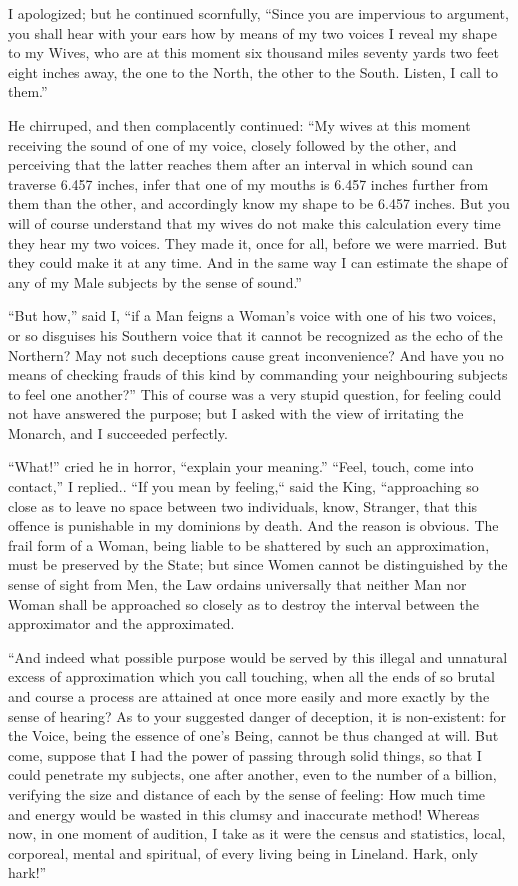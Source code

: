 \documentclass[12pt, a4paper, twoside]{memoir}
\begin{document}
I apologized; but he continued scornfully, ``Since you are impervious to
argument, you shall hear with your ears how by means of my two voices I reveal
my shape to my Wives, who are at this moment six thousand miles seventy yards
two feet eight inches away, the one to the North, the other to the South.
Listen, I call to them.''

He chirruped, and then complacently continued: ``My wives at this moment
receiving the sound of one of my voice, closely followed by the other, and
perceiving that the latter reaches them after an interval in which sound can
traverse 6.457 inches, infer that one of my mouths is 6.457 inches further
from them than the other, and accordingly know my shape to be 6.457 inches.
But you will of course understand that my wives do not make this calculation
every time they hear my two voices. They made it, once for all, before we were
married. But they could make it at any time. And in the same way I can
estimate the shape of any of my Male subjects by the sense of sound.''

``But how,'' said I, ``if a Man feigns a Woman's voice with one of his two
voices, or so disguises his Southern voice that it cannot be recognized as the
echo of the Northern? May not such deceptions cause great inconvenience? And
have you no means of checking frauds of this kind by commanding your
neighbouring subjects to feel one another?'' This of course was a very stupid
question, for feeling could not have answered the purpose; but I asked with
the view of irritating the Monarch, and I succeeded perfectly.

``What!'' cried he in horror, ``explain your meaning.'' ``Feel, touch, come into
contact,'' I replied.. ``If you mean by feeling,`` said the King, ``approaching so
close as to leave no space between two individuals, know, Stranger, that this
offence is punishable in my dominions by death. And the reason is obvious. The
frail form of a Woman, being liable to be shattered by such an approximation,
must be preserved by the State; but since Women cannot be distinguished by the
sense of sight from Men, the Law ordains universally that neither Man nor
Woman shall be approached so closely as to destroy the interval between the
approximator and the approximated.

``And indeed what possible purpose would be served by this illegal and
unnatural excess of approximation which you call touching, when all the ends
of so brutal and course a process are attained at once more easily and more
exactly by the sense of hearing? As to your suggested danger of deception, it
is non-existent: for the Voice, being the essence of one's Being, cannot be
thus changed at will. But come, suppose that I had the power of passing
through solid things, so that I could penetrate my subjects, one after
another, even to the number of a billion, verifying the size and distance of
each by the sense of feeling: How much time and energy would be wasted in this
clumsy and inaccurate method! Whereas now, in one moment of audition, I take
as it were the census and statistics, local, corporeal, mental and spiritual,
of every living being in Lineland. Hark, only hark!''
\end{document}
